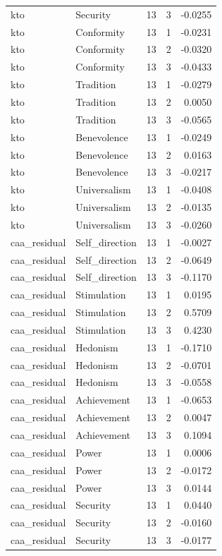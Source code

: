 \begin{tabular}{llrrr}
kto & Security & 13 & 3 & -0.0255 \\
kto & Conformity & 13 & 1 & -0.0231 \\
kto & Conformity & 13 & 2 & -0.0320 \\
kto & Conformity & 13 & 3 & -0.0433 \\
kto & Tradition & 13 & 1 & -0.0279 \\
kto & Tradition & 13 & 2 & 0.0050 \\
kto & Tradition & 13 & 3 & -0.0565 \\
kto & Benevolence & 13 & 1 & -0.0249 \\
kto & Benevolence & 13 & 2 & 0.0163 \\
kto & Benevolence & 13 & 3 & -0.0217 \\
kto & Universalism & 13 & 1 & -0.0408 \\
kto & Universalism & 13 & 2 & -0.0135 \\
kto & Universalism & 13 & 3 & -0.0260 \\
caa\_residual & Self\_direction & 13 & 1 & -0.0027 \\
caa\_residual & Self\_direction & 13 & 2 & -0.0649 \\
caa\_residual & Self\_direction & 13 & 3 & -0.1170 \\
caa\_residual & Stimulation & 13 & 1 & 0.0195 \\
caa\_residual & Stimulation & 13 & 2 & 0.5709 \\
caa\_residual & Stimulation & 13 & 3 & 0.4230 \\
caa\_residual & Hedonism & 13 & 1 & -0.1710 \\
caa\_residual & Hedonism & 13 & 2 & -0.0701 \\
caa\_residual & Hedonism & 13 & 3 & -0.0558 \\
caa\_residual & Achievement & 13 & 1 & -0.0653 \\
caa\_residual & Achievement & 13 & 2 & 0.0047 \\
caa\_residual & Achievement & 13 & 3 & 0.1094 \\
caa\_residual & Power & 13 & 1 & 0.0006 \\
caa\_residual & Power & 13 & 2 & -0.0172 \\
caa\_residual & Power & 13 & 3 & 0.0144 \\
caa\_residual & Security & 13 & 1 & 0.0440 \\
caa\_residual & Security & 13 & 2 & -0.0160 \\
caa\_residual & Security & 13 & 3 & -0.0177 \\

\end{tabular}
